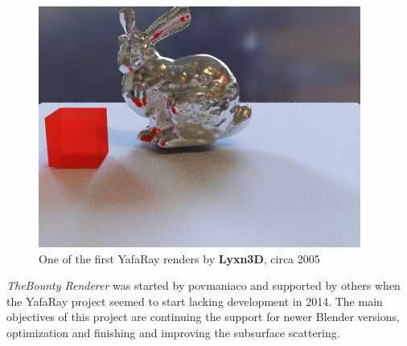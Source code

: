 \begin{figure}
    \centering
    \includegraphics[width=.9\textwidth]{images/bunny_ibl.jpg}
    \caption{One of the first YafaRay renders by \textbf{Lyxn3D}, circa 2005}
\end{figure}

\textit{TheBounty Renderer} was started by povmaniaco and supported by others when the YafaRay project seemed to start lacking development in 2014. The main objectives of this project are continuing the support for newer Blender versions, optimization and finishing and improving the subsurface scattering.
